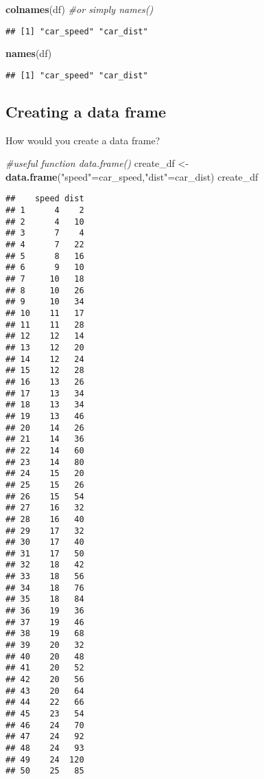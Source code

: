 \documentclass[
]{article}
\newenvironment{Shaded}{\begin{snugshade}}{\end{snugshade}}
\newcommand{\CommentTok}[1]{\textcolor[rgb]{0.56,0.35,0.01}{\textit{#1}}}
\newcommand{\KeywordTok}[1]{\textcolor[rgb]{0.13,0.29,0.53}{\textbf{#1}}}
\newcommand{\NormalTok}[1]{#1}
\newcommand{\StringTok}[1]{\textcolor[rgb]{0.31,0.60,0.02}{#1}}
\begin{document}
\begin{Shaded}
\begin{Highlighting}[]
\KeywordTok{colnames}\NormalTok{(df)  }\CommentTok{#or simply names()}
\end{Highlighting}
\end{Shaded}

\begin{verbatim}
## [1] "car_speed" "car_dist"
\end{verbatim}

\begin{Shaded}
\begin{Highlighting}[]
\KeywordTok{names}\NormalTok{(df)}
\end{Highlighting}
\end{Shaded}

\begin{verbatim}
## [1] "car_speed" "car_dist"
\end{verbatim}

\hypertarget{creating-a-data-frame}{%
\subsection{Creating a data frame}\label{creating-a-data-frame}}

How would you create a data frame?

\begin{Shaded}
\begin{Highlighting}[]
\CommentTok{#useful function data.frame()}
\NormalTok{create_df <-}\StringTok{ }\KeywordTok{data.frame}\NormalTok{(}\StringTok{"speed"}\NormalTok{=car_speed,}\StringTok{"dist"}\NormalTok{=car_dist)}
\NormalTok{create_df}
\end{Highlighting}
\end{Shaded}

\begin{verbatim}
##    speed dist
## 1      4    2
## 2      4   10
## 3      7    4
## 4      7   22
## 5      8   16
## 6      9   10
## 7     10   18
## 8     10   26
## 9     10   34
## 10    11   17
## 11    11   28
## 12    12   14
## 13    12   20
## 14    12   24
## 15    12   28
## 16    13   26
## 17    13   34
## 18    13   34
## 19    13   46
## 20    14   26
## 21    14   36
## 22    14   60
## 23    14   80
## 24    15   20
## 25    15   26
## 26    15   54
## 27    16   32
## 28    16   40
## 29    17   32
## 30    17   40
## 31    17   50
## 32    18   42
## 33    18   56
## 34    18   76
## 35    18   84
## 36    19   36
## 37    19   46
## 38    19   68
## 39    20   32
## 40    20   48
## 41    20   52
## 42    20   56
## 43    20   64
## 44    22   66
## 45    23   54
## 46    24   70
## 47    24   92
## 48    24   93
## 49    24  120
## 50    25   85
\end{verbatim}
\end{document}
